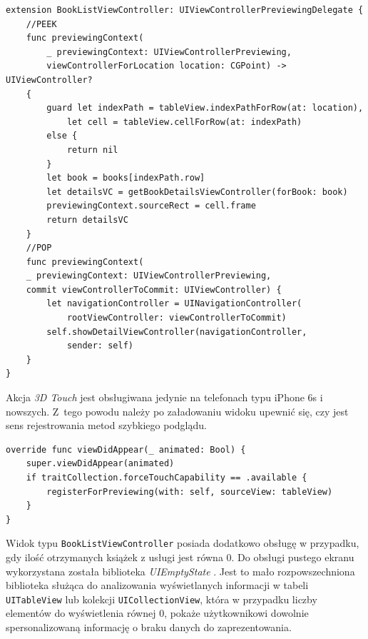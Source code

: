 \documentclass[twoside]{projektInzynierskiMS}
\begin{document}
\begin{verbatim}
extension BookListViewController: UIViewControllerPreviewingDelegate {
    //PEEK
    func previewingContext(
        _ previewingContext: UIViewControllerPreviewing,
        viewControllerForLocation location: CGPoint) -> UIViewController?
    {
        guard let indexPath = tableView.indexPathForRow(at: location),
            let cell = tableView.cellForRow(at: indexPath)
        else {
            return nil
        }
        let book = books[indexPath.row]
        let detailsVC = getBookDetailsViewController(forBook: book)
        previewingContext.sourceRect = cell.frame
        return detailsVC
    }
    //POP
    func previewingContext(
    _ previewingContext: UIViewControllerPreviewing,
    commit viewControllerToCommit: UIViewController) {
        let navigationController = UINavigationController(
            rootViewController: viewControllerToCommit)
        self.showDetailViewController(navigationController,
            sender: self)
    }
}
\end{verbatim}
Akcja \textit{3D Touch} jest obsługiwana jedynie na telefonach typu iPhone 6s i nowszych. Z~tego powodu należy po załadowaniu widoku upewnić się, czy jest sens rejestrowania metod szybkiego podglądu.
\begin{verbatim}
override func viewDidAppear(_ animated: Bool) {
    super.viewDidAppear(animated)
    if traitCollection.forceTouchCapability == .available {
        registerForPreviewing(with: self, sourceView: tableView)
    }
}
\end{verbatim}

Widok typu \verb`BookListViewController` posiada dodatkowo obsługę w przypadku, gdy ilość otrzymanych książek z usługi jest równa 0. Do obsługi pustego ekranu wykorzystana została biblioteka \textit{UIEmptyState} \cite{UIEmptyState}. Jest to mało rozpowszechniona biblioteka służąca do analizowania wyświetlanych informacji w tabeli \verb`UITableView` lub kolekcji \verb`UICollectionView`, która w przypadku liczby elementów do wyświetlenia równej 0, pokaże użytkownikowi dowolnie spersonalizowaną informację o braku danych do zaprezentowania.
\end{document}
